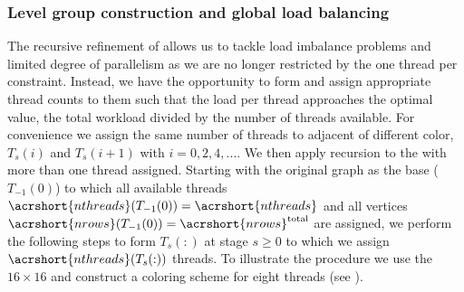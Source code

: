           
\subsubsection{Level group construction and global load balancing} \label{subsec:subgraph_selection}

The recursive refinement of \levelGroups allows us to tackle load imbalance
problems and limited degree of parallelism as we are no longer restricted by the
one thread per \levelGroup constraint.  Instead, we have the opportunity to form
\levelGroups and assign appropriate thread counts to them such that the load per
thread approaches the optimal value, \ie the total workload divided by the number of
threads available. For convenience we assign the same number of threads to
adjacent \levelGroups of different color, \ie $T_s(i)$ and $T_s(i+1)$ with
$i=0,2,4,...$. We then apply recursion to the \levelGroups with more than one
thread assigned. Starting with the original graph as the base \levelGroup
($T_{-1}(0)$) to which all available threads
$\acrshort{nthreads}(T_{-1}(0))=\acrshort{nthreads}$ and all vertices
$\acrshort{nrows}(T_{-1}(0))=\acrshort{nrows}^\mathrm{total}$ are assigned, we perform
the following steps to form \levelGroups $T_s(:)$ at stage $s \ge 0$ to which we
assign $\acrshort{nthreads}(T_{s}(:))$ threads. To illustrate the procedure we
use the $16 \times 16$ \stex and construct a coloring scheme for eight threads
(see ).

